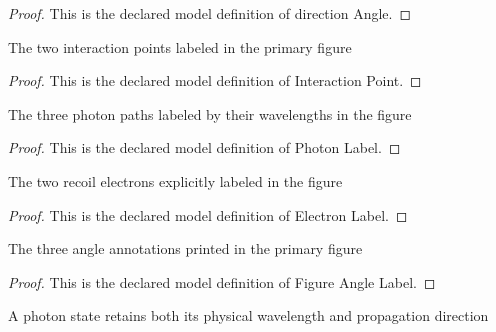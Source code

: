 \begin{proof}
  This is the declared model definition of direction Angle.
\end{proof}
\begin{definition}
  \label{def:physics:phyx-mini-0530:phyxminiproblems-problemphyxmini0530-interactionpoint}
  The two interaction points labeled in the primary figure
\end{definition}
\begin{proof}
  This is the declared model definition of Interaction Point.
\end{proof}
\begin{definition}
  \label{def:physics:phyx-mini-0530:phyxminiproblems-problemphyxmini0530-photonlabel}
  The three photon paths labeled by their wavelengths in the figure
\end{definition}
\begin{proof}
  This is the declared model definition of Photon Label.
\end{proof}
\begin{definition}
  \label{def:physics:phyx-mini-0530:phyxminiproblems-problemphyxmini0530-electronlabel}
  The two recoil electrons explicitly labeled in the figure
\end{definition}
\begin{proof}
  This is the declared model definition of Electron Label.
\end{proof}
\begin{definition}
  \label{def:physics:phyx-mini-0530:phyxminiproblems-problemphyxmini0530-figureanglelabel}
  The three angle annotations printed in the primary figure
\end{definition}
\begin{proof}
  This is the declared model definition of Figure Angle Label.
\end{proof}
\begin{definition}
  \label{def:physics:phyx-mini-0530:phyxminiproblems-problemphyxmini0530-photonstate}
  A photon state retains both its physical wavelength and propagation direction
\end{definition}
